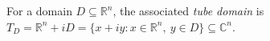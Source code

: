 
For a domain $D\subseteq\mathbb R^n$, the associated \emph{tube domain} is $T_D=\mathbb R^n+iD=\{x+iy:x\in\mathbb R^n,\ y\in D\}\subseteq\mathbb C^n$.
